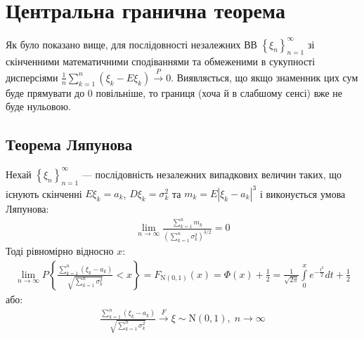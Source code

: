 \section{Центральна гранична теорема}
Як було показано вище, для послідовності незалежних ВВ 
$\left\{ \xi_n\right\}_{n=1}^\infty$ зі скінченними математичними сподіваннями та обмеженими в сукупності
дисперсіями $\frac{1}{n}\sum\limits_{k=1}^n (\xi_k - E\xi_k) \overset{P}{\longrightarrow} 0$.
Виявляється, що якщо знаменник цих сум буде прямувати до $0$ повільніше, то границя (хоча й в слабшому сенсі) вже не буде нульовою.
\subsection{Теорема Ляпунова}
\begin{theorem*}
    Нехай $\left\{ \xi_n\right\}_{n=1}^\infty$ --- послідовність незалежних випадкових величин таких, 
    що існують скінченні $E\xi_k = a_k$, $D\xi_k = \sigma_k^2$ та
    $m_k = E\left|\xi_k - a_k\right|^3$ і виконується умова Ляпунова:
    \begin{gather*}
        \lim_{n \rightarrow \infty} \frac{\sum\limits_{k=1}^n m_k}{\left(
            \sum\limits_{k=1}^n \sigma_k^2
        \right)^{3/2}} = 0
    \end{gather*}
    Тоді рівномірно відносно $x$:
    \begin{gather}
        \lim_{n \rightarrow \infty} P \left\{
            \frac{\sum\limits_{k=1}^n (\xi_k - a_k)}
            {\sqrt{\sum\limits_{k=1}^n \sigma_k^2}}
            < x
        \right\} = F_{\mathrm{N}(0, 1)}(x) = \Phi(x) + \frac{1}{2} = 
        \frac{1}{\sqrt{2\pi}} \int\limits_0^x e^{-\frac{t^2}{2}} dt + \frac{1}{2}
    \end{gather}
    або:
    \begin{gather*}
        \frac{\sum\limits_{k=1}^n (\xi_k - a_k)}
        {\sqrt{\sum\limits_{k=1}^n \sigma_k^2}}
        \overset{F}{\longrightarrow} \xi \sim \mathrm{N}(0, 1),  \; n\to \infty
    \end{gather*}
\end{theorem*}
